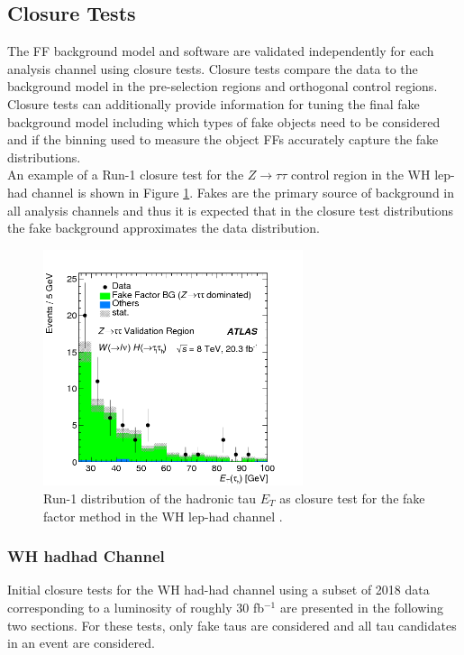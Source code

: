 \subsection{Closure Tests}\label{sec:closure}
The FF background model and software are validated independently for each analysis channel using closure tests. Closure tests compare the data to the background model in the pre-selection regions and orthogonal control regions. Closure tests can additionally provide information for tuning the final fake background model including which types of fake objects need to be considered and if the binning used to measure the object FFs accurately capture the fake distributions.\\

An example of a Run-1 closure test for the $Z\rightarrow\tau\tau$ control region in the WH lep-had channel is shown in Figure \ref{fig:run1_ff_cr}. Fakes are the primary source of background in all analysis channels and thus it is expected that in the closure test distributions the fake background approximates the data distribution.\\  

\begin{figure}[htb!]
    \centering
    \includegraphics[width=3in]{figures/chapter7/run1_ff_cr.png}
    \caption{Run-1 distribution of the hadronic tau $E_T$ as closure test for the fake factor method in the WH lep-had channel \cite{vh_run1_paper}.}
    \label{fig:run1_ff_cr}
\end{figure}

\subsubsection{WH hadhad Channel}
Initial closure tests for the WH had-had channel using a subset of 2018 data corresponding to a luminosity of roughly 30 fb$^{-1}$ are presented in the following two sections. For these tests, only fake taus are considered and all tau candidates in an event are considered.

